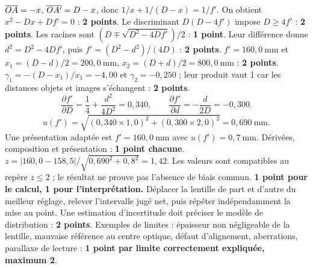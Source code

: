 $\overline{OA}=-x$, $\overline{OA'}=D-x$, donc $1/x+1/(D-x)=1/f'$. On obtient $x^2-Dx+Df'=0$ : \textbf{2 points}. Le discriminant $D(D-4f')$ impose $D\geq4f'$ : \textbf{2 points}.
Les racines sont $(D\mp\sqrt{D^2-4Df'})/2$ : \textbf{1 point}. Leur différence donne $d^2=D^2-4Df'$, puis $f'=(D^2-d^2)/(4D)$ : \textbf{2 points}.
$f'=160{,}0\ \mathrm{mm}$ et $x_1=(D-d)/2=200{,}0\ \mathrm{mm}$, $x_2=(D+d)/2=800{,}0\ \mathrm{mm}$ : \textbf{2 points}.
$\gamma_1=-(D-x_1)/x_1=-4{,}00$ et $\gamma_2=-0{,}250$ ; leur produit vaut 1 car les distances objets et images s'échangent : \textbf{2 points}.
\[\frac{\partial f'}{\partial D}=\frac14+\frac{d^2}{4D^2}=0{,}340,
\qquad \frac{\partial f'}{\partial d}=-\frac d{2D}=-0{,}300.\]
\[u(f')=\sqrt{(0{,}340\times1{,}0)^2+(0{,}300\times2{,}0)^2}
=0{,}690\ \mathrm{mm}.\]
Une présentation adaptée est $f'=160{,}0\ \mathrm{mm}$ avec $u(f')=0{,}7\ \mathrm{mm}$. Dérivées, composition et présentation : \textbf{1 point chacune}.
$z=|160{,}0-158{,}5|/\sqrt{0{,}690^2+0{,}8^2}=1{,}42$. Les valeurs sont compatibles au repère $z\leq2$ ; le résultat ne prouve pas l'absence de biais commun. \textbf{1 point pour le calcul, 1 pour l'interprétation.}
Déplacer la lentille de part et d'autre du meilleur réglage, relever l'intervalle jugé net, puis répéter indépendamment la mise au point. Une estimation d'incertitude doit préciser le modèle de distribution : \textbf{2 points}.
Exemples de limites : épaisseur non négligeable de la lentille, mauvaise référence au centre optique, défaut d'alignement, aberrations, parallaxe de lecture : \textbf{1 point par limite correctement expliquée, maximum 2}.

